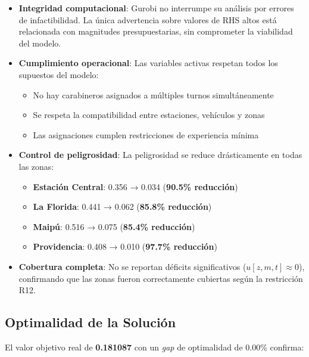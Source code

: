 \begin{itemize}
    \item \textbf{Integridad computacional}: Gurobi no interrumpe su análisis por errores de infactibilidad. La única advertencia sobre valores de RHS altos está relacionada con magnitudes presupuestarias, sin comprometer la viabilidad del modelo.
    
    \item \textbf{Cumplimiento operacional}: Las variables activas respetan todos los supuestos del modelo:
    \begin{itemize}
        \item No hay carabineros asignados a múltiples turnos simultáneamente
        \item Se respeta la compatibilidad entre estaciones, vehículos y zonas
        \item Las asignaciones cumplen restricciones de experiencia mínima
    \end{itemize}
    
    \item \textbf{Control de peligrosidad}: La peligrosidad se reduce drásticamente en todas las zonas:
    \begin{itemize}
        \item \textbf{Estación Central}: 0.356 → 0.034 (\textbf{90.5\% reducción})
        \item \textbf{La Florida}: 0.441 → 0.062 (\textbf{85.8\% reducción})
        \item \textbf{Maipú}: 0.516 → 0.075 (\textbf{85.4\% reducción})
        \item \textbf{Providencia}: 0.408 → 0.010 (\textbf{97.7\% reducción})
    \end{itemize}
    
    \item \textbf{Cobertura completa}: No se reportan déficits significativos ($u[z,m,t] \approx 0$), confirmando que las zonas fueron correctamente cubiertas según la restricción R12.
\end{itemize}

\subsection{Optimalidad de la Solución}

El valor objetivo real de \textbf{0.181087} con un \textit{gap} de optimalidad de 0.00\% confirma:


